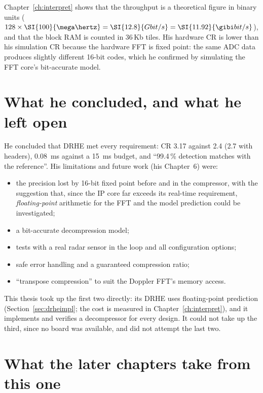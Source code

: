 \noindent
Chapter~\ref{ch:interpret} shows that the throughput is a theoretical figure
in binary units ($128 \times \SI{100}{\mega\hertz} = \SI{12.8}{Gbit/s} =
\SI{11.92}{\gibi bit/s}$), and that the block RAM is counted in 36\,Kb tiles.
His hardware CR is lower than his simulation CR because the hardware FFT is
fixed point: the same ADC data produces slightly different 16-bit codes, which
he confirmed by simulating the FFT core's bit-accurate model.

\section{What he concluded, and what he left open}
\label{sec:kiem_open}

He concluded that DRHE met every requirement: CR \num{3.17} against 2.4 (2.7
with headers), \SI{0.08}{\milli\second} against a \SI{15}{\milli\second}
budget, and ``99.4\,\% detection matches with the reference''. His
limitations and future work (his Chapter~6) were:

\begin{itemize}
\item the precision lost by 16-bit fixed point before and in the compressor,
with the suggestion that, since the IP core far exceeds its real-time
requirement, \emph{floating-point} arithmetic for the FFT and the model
prediction could be investigated;
\item a bit-accurate decompression model;
\item tests with a real radar sensor in the loop and all configuration options;
\item safe error handling and a guaranteed compression ratio;
\item ``transpose compression'' to suit the Doppler FFT's memory access.
\end{itemize}

\noindent
This thesis took up the first two directly: its DRHE uses floating-point
prediction (Section~\ref{sec:drheimpl}; the cost is measured in
Chapter~\ref{ch:interpret}), and it implements and verifies a decompressor for
every design. It could not take up the third, since no board was available,
and did not attempt the last two.

\section{What the later chapters take from this one}

